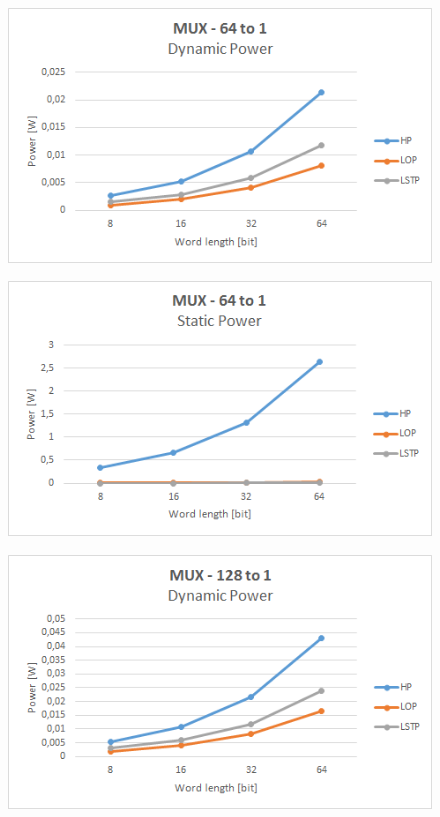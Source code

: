 \begin{figure}[!h]
	\centering
	\includegraphics[scale=0.8]{immagini/64to1D}
	\caption{\textit{}} 
	\label{7}
\end{figure}
\newpage
\begin{figure}[!h]
	\centering
	\includegraphics[scale=0.8]{immagini/64to1S}
	\caption{\textit{}} 
	\label{8}
\end{figure}

\begin{figure}[!h]
	\centering
	\includegraphics[scale=0.8]{immagini/128to1D}
	\caption{\textit{}} 
	\label{9}
\end{figure}

